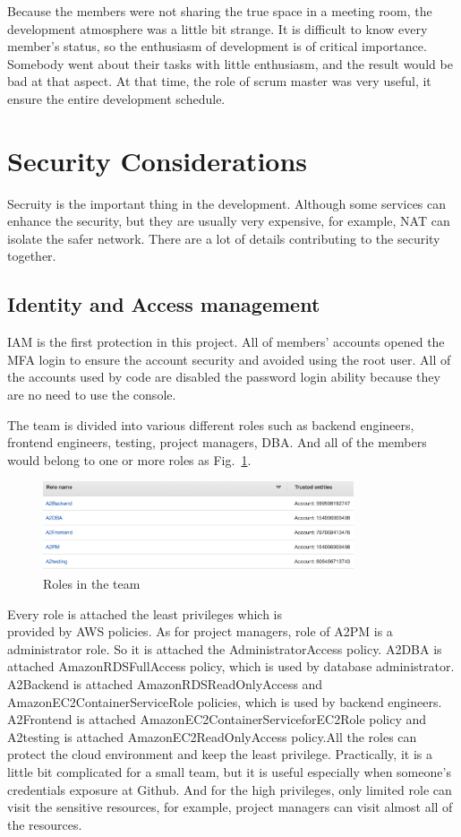 \documentclass[conference]{IEEEtran}
\begin{document}
Because the members were not sharing the true space in a meeting room, the development atmosphere was a little bit strange. It is difficult to know 
every member's status, so the enthusiasm of development is of critical importance. Somebody went about their tasks with little enthusiasm, and the 
result would be bad at that aspect. At that time, the role of scrum master was very useful, it ensure the entire development schedule.

\section{Security Considerations}

Secruity is the important thing in the development. Although some services can enhance the security, but they are usually very expensive, for example, 
NAT can isolate the safer network. There are a lot of details contributing to the security together.

\subsection{Identity and Access management}

IAM is the first protection in this project. All of members' accounts opened the MFA login to ensure the account security and avoided using the root user. 
All of the accounts used by code are disabled the password login ability because they are no need to use the console. 

The team is divided into various different roles such as backend engineers, frontend engineers, 
testing, project managers, DBA. And all of the members would belong to one or more roles as Fig.~\ref{roles}. 

\begin{figure}[htbp]
    \centerline{\includegraphics[width=260pt]{images/roles.png}}
    \caption{Roles in the team}
    \label{roles}
\end{figure}

Every role is attached the least privileges which is \\ provided by AWS policies. As for project managers, role of A2PM is a administrator role. So it is 
attached the AdministratorAccess policy. A2DBA is attached AmazonRDSFullAccess policy, which is used by database administrator. A2Backend is attached 
AmazonRDSReadOnlyAccess and AmazonEC2ContainerServiceRole policies, which is used by backend engineers. A2Frontend is attached AmazonEC2ContainerServiceforEC2Role 
policy and A2testing is attached AmazonEC2ReadOnlyAccess policy.All the roles can protect the cloud environment and keep the least privilege. Practically, it is 
a little bit complicated for a small team, but it is useful especially when someone's credentials exposure at Github. And for the high privileges, only 
limited role can visit the sensitive resources, for example, project managers can visit almost all of the resources.
\end{document}
